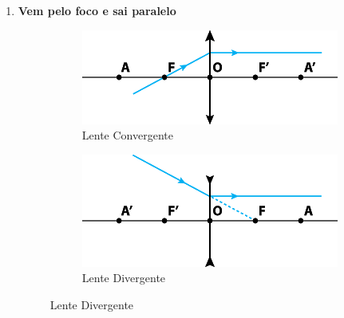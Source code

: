 \documentclass[12pt]{extarticle}
\newcommand{\<}{\langle}
\renewcommand{\>}{\rangle}
\theoremstyle{definition}
\begin{document}
\begin{enumerate}
    \item \textbf{Vem pelo foco e sai paralelo}
    \begin{figure}[H]
        \centering
        \begin{subfigure}[b]{0.45\textwidth}
         \centering
         \includegraphics[width=\textwidth]{notaveis_conv_2.png}
         \caption{Lente Convergente}
         \label{fig:raios_conv_2}
     \end{subfigure}
     \hfill
     \begin{subfigure}[b]{0.45\textwidth}
         \centering
         \includegraphics[width=\textwidth]{notaveis_div_2.png}
         \caption{Lente Divergente}
         \label{fig:raios_div_2}
     \end{subfigure}
    \end{figure}
    

\end{enumerate}
\end{document}
